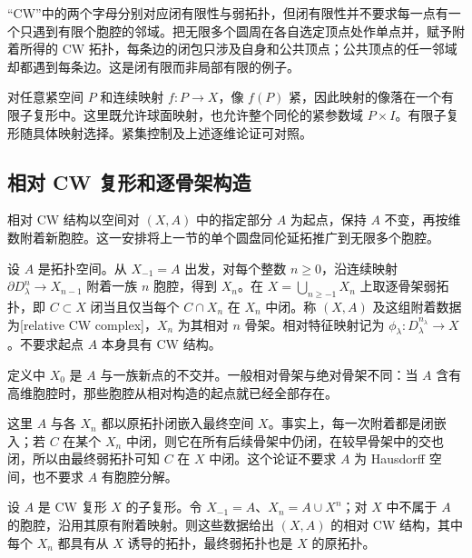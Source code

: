 “CW”中的两个字母分别对应闭有限性与弱拓扑，但闭有限性并不要求每一点有一个只遇到有限个胞腔的邻域。把无限多个圆周在各自选定顶点处作单点并，赋予附着所得的 CW 拓扑，每条边的闭包只涉及自身和公共顶点；公共顶点的任一邻域却都遇到每条边。这是闭有限而非局部有限的例子。

\ProseParagraphBreak

对任意紧空间 \(P\) 和连续映射 \(f:P\to X\)，像 \(f(P)\) 紧，因此映射的像落在一个有限子复形中。这里既允许球面映射，也允许整个同伦的紧参数域 \(P\times I\)。有限子复形随具体映射选择。紧集控制及上述逐维论证可对照\cite[附录“Topology of Cell Complexes”]{Hatcher2002}。

\subsection{相对 CW 复形和逐骨架构造}
\label{g2:subsec:0103:03}
相对 CW 结构以空间对 \((X,A)\) 中的指定部分 \(A\) 为起点，保持 \(A\) 不变，再按维数附着新胞腔。这一安排将上一节的单个圆盘同伦延拓推广到无限多个胞腔。

\begin{definition}[相对 CW 复形]
	\label{g2:def:relative-cw-complex}
	设 \(A\) 是拓扑空间。从 \(X_{-1}=A\) 出发，对每个整数 \(n\geq0\)，沿连续映射 \(\partial D^n_\lambda\to X_{n-1}\) 附着一族 \(n\) 胞腔，得到 \(X_n\)。在 \(X=\bigcup_{n\geq-1}X_n\) 上取逐骨架弱拓扑，即 \(C\subset X\) 闭当且仅当每个 \(C\cap X_n\) 在 \(X_n\) 中闭。称 \((X,A)\) 及这组附着数据为[relative CW complex]，\(X_n\) 为其相对 \(n\) 骨架。相对特征映射记为 \(\phi_\lambda:D^{n_\lambda}_\lambda\to X\)。不要求起点 \(A\) 本身具有 CW 结构。
\end{definition}

定义中 \(X_0\) 是 \(A\) 与一族新点的不交并。一般相对骨架与绝对骨架不同：当 \(A\) 含有高维胞腔时，那些胞腔从相对构造的起点就已经全部存在。

这里 \(A\) 与各 \(X_n\) 都以原拓扑闭嵌入最终空间 \(X\)。事实上，每一次附着都是闭嵌入；若 \(C\) 在某个 \(X_n\) 中闭，则它在所有后续骨架中仍闭，在较早骨架中的交也闭，所以由最终弱拓扑可知 \(C\) 在 \(X\) 中闭。这个论证不要求 \(A\) 为 Hausdorff 空间，也不要求 \(A\) 有胞腔分解。

\begin{proposition}
	\label{g2:prop:cw-pair-relative}
	设 \(A\) 是 CW 复形 \(X\) 的子复形。令 \(X_{-1}=A\)、\(X_n=A\cup X^n\)；对 \(X\) 中不属于 \(A\) 的胞腔，沿用其原有附着映射。则这些数据给出 \((X,A)\) 的相对 CW 结构，其中每个 \(X_n\) 都具有从 \(X\) 诱导的拓扑，最终弱拓扑也是 \(X\) 的原拓扑。
\end{proposition}


